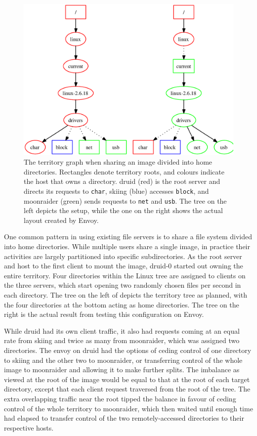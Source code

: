 \begin{figure}[t]
\centering
\includegraphics[width=\figwidth]{figures/territory-home}
\caption[Territory graph for home directory sharing]{The territory graph when sharing an image divided into home directories. Rectangles denote territory roots, and colours indicate the host that owns a directory. druid (red) is the root server and directs its requests to \texttt{char}, skiing (blue) accesses \texttt{block}, and moonraider (green) sends requests to \texttt{net} and \texttt{usb}. The tree on the left depicts the setup, while the one on the right shows the actual layout created by Envoy.}
\label{fig:territory-home}
\end{figure}

One common pattern in using existing file servers is to share a file system divided into home directories. While multiple users share a single image, in practice their activities are largely partitioned into specific subdirectories. As the root server and host to the first client to mount the image, druid-0 started out owning the entire territory. Four directories within the Linux tree are assigned to clients on the three servers, which start opening two randomly chosen files per second in each directory. The tree on the left of  depicts the territory tree as planned, with the four directories at the bottom acting as home directories. The tree on the right is the actual result from testing this configuration on Envoy.

While druid had its own client traffic, it also had requests coming at an equal rate from skiing and twice as many from moonraider, which was assigned two directories. The envoy on druid had the options of ceding control of one directory to skiing and the other two to moonraider, or transferring control of the whole image to moonraider and allowing it to make further splits. The imbalance as viewed at the root of the image would be equal to that at the root of each target directory, except that each client request traversed from the root of the tree. The extra overlapping traffic near the root tipped the balance in favour of ceding control of the whole territory to moonraider, which then waited until enough time had elapsed to transfer control of the two remotely-accessed directories to their respective hosts.

